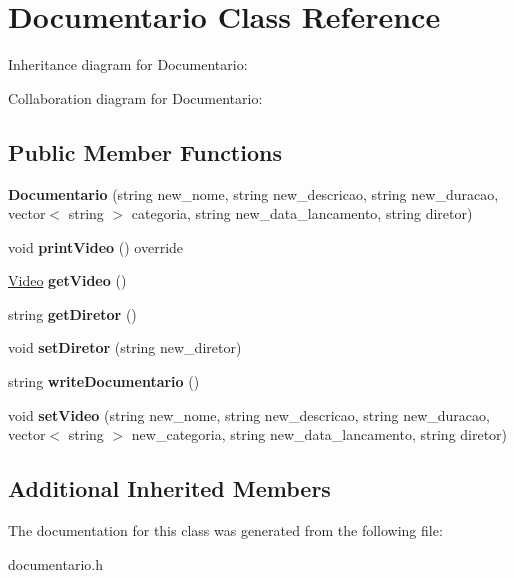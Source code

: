 \hypertarget{classDocumentario}{}\section{Documentario Class Reference}
\label{classDocumentario}


Inheritance diagram for Documentario\+:


Collaboration diagram for Documentario\+:
\subsection*{Public Member Functions}
\begin{DoxyCompactItemize}
\item 
{\bfseries Documentario} (string new\+\_\+nome, string new\+\_\+descricao, string new\+\_\+duracao, vector$<$ string $>$ categoria, string new\+\_\+data\+\_\+lancamento, string diretor)\hypertarget{classDocumentario_af1e9237063a8f47cab171b83ebd17e68}{}\label{classDocumentario_af1e9237063a8f47cab171b83ebd17e68}

\item 
void {\bfseries print\+Video} () override\hypertarget{classDocumentario_abe00fa763c2761ed79f80fb7b2a99de0}{}\label{classDocumentario_abe00fa763c2761ed79f80fb7b2a99de0}

\item 
\hyperlink{classVideo}{Video} {\bfseries get\+Video} ()\hypertarget{classDocumentario_a2e5db493cca5e2e6803368d63215a978}{}\label{classDocumentario_a2e5db493cca5e2e6803368d63215a978}

\item 
string {\bfseries get\+Diretor} ()\hypertarget{classDocumentario_acad522309e6e8c8a56324897ffdab5f4}{}\label{classDocumentario_acad522309e6e8c8a56324897ffdab5f4}

\item 
void {\bfseries set\+Diretor} (string new\+\_\+diretor)\hypertarget{classDocumentario_a0998f80222836821c7de4cc4df2153f8}{}\label{classDocumentario_a0998f80222836821c7de4cc4df2153f8}

\item 
string {\bfseries write\+Documentario} ()\hypertarget{classDocumentario_a02bb364042381520cc90b03da9f73ffd}{}\label{classDocumentario_a02bb364042381520cc90b03da9f73ffd}

\item 
void {\bfseries set\+Video} (string new\+\_\+nome, string new\+\_\+descricao, string new\+\_\+duracao, vector$<$ string $>$ new\+\_\+categoria, string new\+\_\+data\+\_\+lancamento, string diretor)\hypertarget{classDocumentario_abb7ad2e1d60b0dea2f39285d73a883f2}{}\label{classDocumentario_abb7ad2e1d60b0dea2f39285d73a883f2}

\end{DoxyCompactItemize}
\subsection*{Additional Inherited Members}


The documentation for this class was generated from the following file\+:\begin{DoxyCompactItemize}
\item 
documentario.\+h\end{DoxyCompactItemize}
